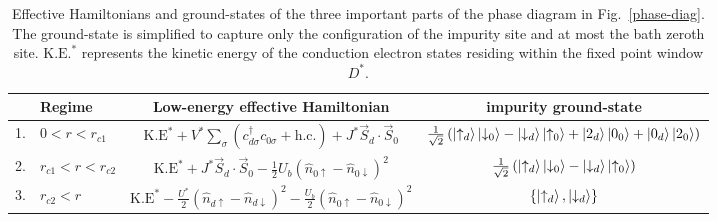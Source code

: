 \begin{table}[!htbp]
\centering
\begin{tabular}{|cl|c|c|}
\hline
& Regime & Low-energy effective Hamiltonian & impurity ground-state\\[5pt]
\hline
1. & \(0 < r < r_{c1}\) &  \(\text{K.E}^* + V^*\sum_\sigma \left( c^\dagger_{d\sigma}c_{0\sigma} + \text{h.c.}\right) + J^* \vec{S}_d\cdot\vec{S}_0\) & \(\frac{1}{\sqrt 2}\left(\ket{\uparrow_d}\ket{\downarrow_0} - \ket{\downarrow_d} \ket{\uparrow_0} + \ket{2_d}\ket{0_0} + \ket{0_d} \ket{2_0}\right)\)\\[10pt]
2. & \(r_{c1} < r < r_{c2}\) &  \(\text{K.E}^* + J^* \vec{S}_d\cdot\vec{S}_0 - \frac{1}{2}U_b \left(\hat n_{0 \uparrow} - \hat n_{0 \downarrow}\right)^2\) & \(\frac{1}{\sqrt 2}\left(\ket{\uparrow_d}\ket{\downarrow_0} - \ket{\downarrow_d} \ket{\uparrow_0}\right)\)\\[10pt]
3. & \(r_{c2} < r\) &  \(\text{K.E}^* - \frac{U^*}{2}\left(\hat n_{d \uparrow} - \hat n_{d \downarrow}\right)^2 - \frac{U_b}{2} \left(\hat n_{0 \uparrow} - \hat n_{0 \downarrow}\right)^2\) & \(\left\{ \ket{\uparrow_d},\ket{\downarrow_d}\right\}\)\\[5pt]
\hline
\end{tabular}
\caption{Effective Hamiltonians and ground-states of the three important parts of the phase diagram in Fig.~\eqref{phase-diag}. The ground-state is simplified to capture only the configuration of the impurity site and at most the bath zeroth site. \(\text{K.E.}^*\) represents the kinetic energy of the conduction electron states residing within the fixed point window \(D^*\).}
\label{phases-table}
\end{table}

